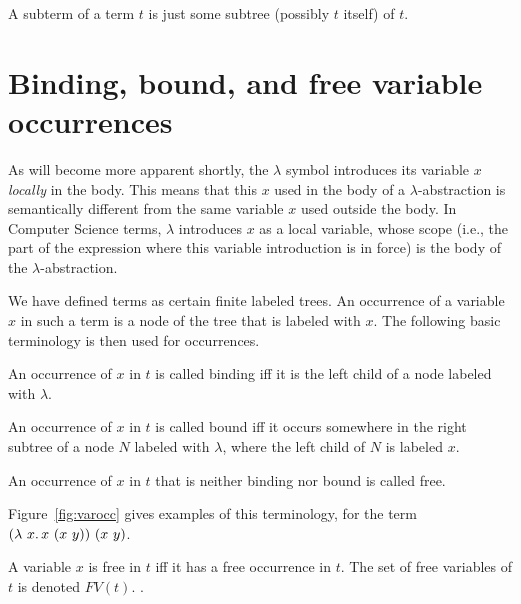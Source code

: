 \begin{definition}[subterm]
  A subterm of a term $t$ is just some subtree (possibly $t$ itself) of $t$.
  \end{definition}

\section{Binding, bound, and free variable occurrences}

As will become more apparent shortly, the $\lambda$ symbol introduces
its variable $x$ \emph{locally} in the body.  This means that this $x$
used in the body of a $\lambda$-abstraction is semantically different
from the same variable $x$ used outside the body.  In Computer Science
terms, $\lambda$ introduces $x$ as a local variable, whose scope
(i.e., the part of the expression where this variable introduction is
in force) is the body of the $\lambda$-abstraction.

We have defined terms as certain finite labeled trees.  An occurrence of a variable $x$ in such a term
is a node of the tree that is labeled with $x$. The following basic terminology is then used for occurrences.

\begin{definition}
  An occurrence of $x$ in $t$ is called binding iff it is
  the left child of a node labeled with $\lambda$.
\end{definition}

\begin{definition}
  An occurrence of $x$ in $t$ is called bound iff it occurs
  somewhere in the right subtree of a node $N$ labeled with $\lambda$,
  where the left child of $N$ is labeled $x$.
\end{definition}

\begin{definition}
  An occurrence of $x$ in $t$ that is neither binding nor bound is called free.
\end{definition}


\noindent Figure~\ref{fig:varocc} gives examples of this terminology, for the term $(\lam{x}{x\ (x\ y)})\ (x\ y)$.

\begin{definition}
  A variable $x$ is free in $t$ iff it has a free occurrence in $t$.  The set of free variables of $t$ is denoted $\textit{FV}(t)$.
  .
\end{definition}

